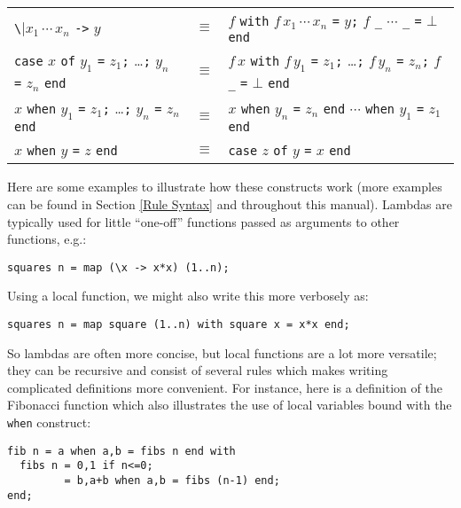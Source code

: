 \documentclass[a4paper,12pt]{article}
\begin{document}
\begin{center}
\begin{tabular}{lcl}
  \verb|\|$x_1\,\cdots\,x_n$ \verb|->| $y$ & $\equiv$ &
    $f$ \lstinline|with| $f\,x_1\,\cdots\,x_n$ \verb|=| $y$\verb|;| $f$ \verb|_| $\cdots$ \verb|_| \verb|=| $\bot$ \lstinline|end|\\
  \lstinline|case| $x$ \lstinline|of| $y_1$ \verb|=| $z_1$\verb|;| \ldots{}\verb|;| $y_n$ \verb|=| $z_n$ \lstinline|end| & $\equiv$ &
    $f\,x$ \lstinline|with| $f\,y_1$ \verb|=| $z_1$\verb|;| \ldots{}\verb|;| $f\,y_n$ \verb|=| $z_n$\verb|;| $f$ \verb|_| \verb|=| $\bot$ \lstinline|end|\\
  $x$ \lstinline|when| $y_1$ \verb|=| $z_1$\verb|;| \ldots{}\verb|;| $y_n$ \verb|=| $z_n$ \lstinline|end| & $\equiv$ &
    $x$ \lstinline|when| $y_n$ \verb|=| $z_n$ \lstinline|end| $\cdots$ \lstinline|when| $y_1$ \verb|=| $z_1$ \lstinline|end|\\
  $x$ \lstinline|when| $y$ \verb|=| $z$ \lstinline|end| & $\equiv$ &
    \lstinline|case| $z$ \lstinline|of| $y$ \verb|=| $x$ \lstinline|end|
\end{tabular}
\end{center}

Here are some examples to illustrate how these constructs work (more examples can be found in Section \ref{Rule Syntax} and throughout this manual). Lambdas are typically used for little ``one-off'' functions passed as arguments to other functions, e.g.:

\begin{lstlisting}
squares n = map (\x -> x*x) (1..n);
\end{lstlisting}

Using a local function, we might also write this more verbosely as:

\begin{lstlisting}
squares n = map square (1..n) with square x = x*x end;
\end{lstlisting}

So lambdas are often more concise, but local functions are a lot more versatile; they can be recursive and consist of several rules which makes writing complicated definitions more convenient. For instance, here is a definition of the Fibonacci function which also illustrates the use of local variables bound with the \lstinline{when} construct:

\begin{lstlisting}
fib n = a when a,b = fibs n end with
  fibs n = 0,1 if n<=0;
         = b,a+b when a,b = fibs (n-1) end;
end;
\end{lstlisting}
\end{document}
